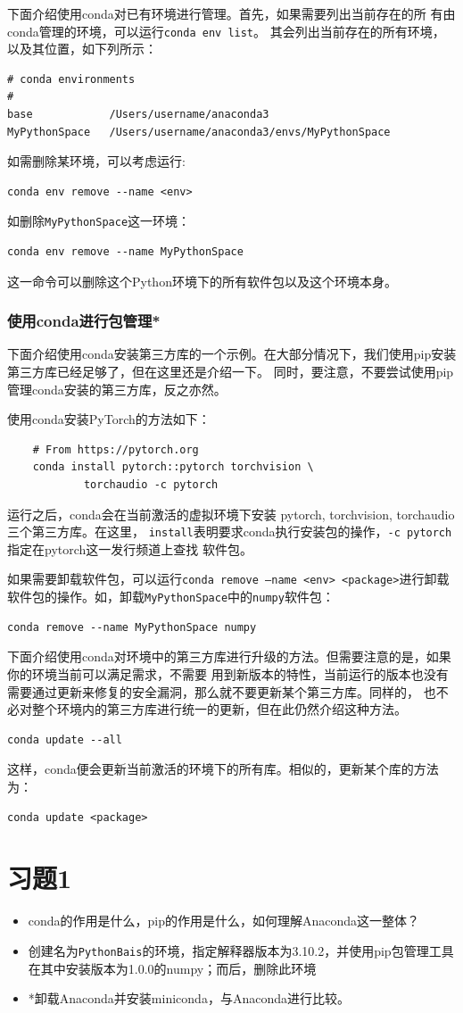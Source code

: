 \documentclass[UTF8]{ctexart}
\begin{document}
下面介绍使用conda对已有环境进行管理。首先，如果需要列出当前存在的所
有由conda管理的环境，可以运行\texttt{conda env list}。
其会列出当前存在的所有环境，以及其位置，如下列所示：
\begin{lstlisting}
# conda environments
#
base            /Users/username/anaconda3
MyPythonSpace   /Users/username/anaconda3/envs/MyPythonSpace
\end{lstlisting}
如需删除某环境，可以考虑运行:
\begin{lstlisting}
conda env remove --name <env>
\end{lstlisting}
如删除\texttt{MyPythonSpace}这一环境：
\begin{lstlisting}
conda env remove --name MyPythonSpace
\end{lstlisting}
这一命令可以删除这个Python环境下的所有软件包以及这个环境本身。

\subsubsection{使用conda进行包管理*}
下面介绍使用conda安装第三方库的一个示例。在大部分情况下，我们使用pip安装第三方库已经足够了，但在这里还是介绍一下。
同时，要注意，不要尝试使用pip管理conda安装的第三方库，反之亦然。

使用conda安装PyTorch的方法如下：
\begin{lstlisting}
    # From https://pytorch.org
    conda install pytorch::pytorch torchvision \
            torchaudio -c pytorch
\end{lstlisting}
运行之后，conda会在当前激活的虚拟环境下安装 pytorch, torchvision, torchaudio 三个第三方库。在这里，
\texttt{install}表明要求conda执行安装包的操作，\texttt{-c pytorch}指定在pytorch这一发行频道上查找
软件包。

如果需要卸载软件包，可以运行\texttt{conda remove --name <env> <package>}进行卸载软件包的操作。如，卸载\texttt{MyPythonSpace}中的\texttt{numpy}软件包：
\begin{lstlisting}
conda remove --name MyPythonSpace numpy
\end{lstlisting}

下面介绍使用conda对环境中的第三方库进行升级的方法。但需要注意的是，如果你的环境当前可以满足需求，不需要
用到新版本的特性，当前运行的版本也没有需要通过更新来修复的安全漏洞，那么就不要更新某个第三方库。同样的，
也不必对整个环境内的第三方库进行统一的更新，但在此仍然介绍这种方法。
\begin{lstlisting}
conda update --all
\end{lstlisting}
这样，conda便会更新当前激活的环境下的所有库。相似的，更新某个库的方法为：
\begin{lstlisting}
conda update <package>
\end{lstlisting}
\newpage
\section*{习题1}
\begin{itemize}
    \item conda的作用是什么，pip的作用是什么，如何理解Anaconda这一整体？
    \item 创建名为\texttt{PythonBais}的环境，指定解释器版本为3.10.2，并使用pip包管理工具在其中安装版本为1.0.0的numpy；而后，删除此环境
    \item *卸载Anaconda并安装miniconda，与Anaconda进行比较。
\end{itemize}
\end{document}
